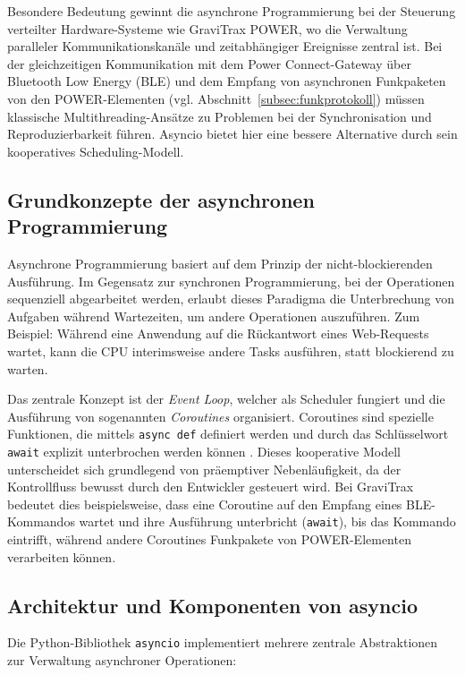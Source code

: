 Besondere Bedeutung gewinnt die asynchrone Programmierung bei der Steuerung verteilter Hardware-Systeme wie GraviTrax POWER, wo die Verwaltung paralleler Kommunikationskanäle und zeitabhängiger Ereignisse zentral ist.
Bei der gleichzeitigen Kommunikation mit dem Power Connect-Gateway über Bluetooth Low Energy (BLE) und dem Empfang von asynchronen Funkpaketen von den POWER-Elementen (vgl. Abschnitt~\ref{subsec:funkprotokoll}) müssen klassische Multithreading-Ansätze zu Problemen bei der Synchronisation und Reproduzierbarkeit führen.
Asyncio bietet hier eine bessere Alternative durch sein kooperatives Scheduling-Modell.

\subsection{Grundkonzepte der asynchronen Programmierung}

Asynchrone Programmierung basiert auf dem Prinzip der nicht-blockierenden Ausführung.
Im Gegensatz zur synchronen Programmierung, bei der Operationen sequenziell abgearbeitet werden, erlaubt dieses Paradigma die Unterbrechung von Aufgaben während Wartezeiten, um andere Operationen auszuführen.
Zum Beispiel: Während eine Anwendung auf die Rückantwort eines Web-Requests wartet, kann die CPU interimsweise andere Tasks ausführen, statt blockierend zu warten.

Das zentrale Konzept ist der \textit{Event Loop}, welcher als Scheduler fungiert und die Ausführung von sogenannten \textit{Coroutines} organisiert.
Coroutines sind spezielle Funktionen, die mittels \texttt{async def} definiert werden und durch das Schlüsselwort \texttt{await} explizit unterbrochen werden können \cite{fowler2022}.
Dieses kooperative Modell unterscheidet sich grundlegend von präemptiver Nebenläufigkeit, da der Kontrollfluss bewusst durch den Entwickler gesteuert wird.
Bei GraviTrax bedeutet dies beispielsweise, dass eine Coroutine auf den Empfang eines BLE-Kommandos wartet und ihre Ausführung unterbricht (\texttt{await}), bis das Kommando eintrifft, während andere Coroutines Funkpakete von POWER-Elementen verarbeiten können.

\subsection{Architektur und Komponenten von asyncio}

Die Python-Bibliothek \texttt{asyncio} implementiert mehrere zentrale Abstraktionen zur Verwaltung asynchroner Operationen:

